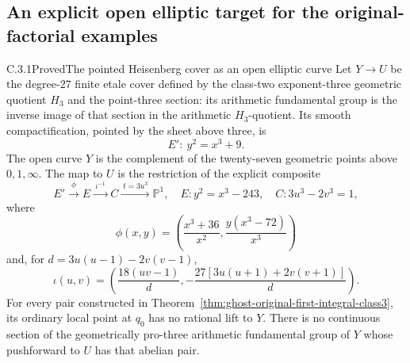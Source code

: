 \subsection{An explicit open elliptic target for the original-factorial examples}
\label{sec:ghost-elliptic-target}

\begin{result}{C.3.1}{Proved}{The pointed Heisenberg cover as an open elliptic curve}
\label{prop:ghost-elliptic-target}
Let \(Y\to U\) be the degree-\(27\) finite etale
cover defined by the class-two exponent-three geometric
quotient \(H_3\) and the point-three section: its
arithmetic fundamental group is the inverse image
of that section in the arithmetic \(H_3\)-quotient.
Its smooth compactification, pointed by the sheet
above three, is
\[
                 E':\ y^2=x^3+9.
\]
The open curve \(Y\) is the complement of the
twenty-seven geometric points above \(0,1,\infty\).
The map to \(U\) is the restriction of the explicit
composite
\[
 E'\xrightarrow{\ \phi\ } E
   \xrightarrow{\ \iota^{-1}\ } C
   \xrightarrow{\ t=3u^3\ }\mathbb P^1,
 \quad
 E:y^2=x^3-243,\quad C:3u^3-2v^3=1,
                                                        \tag{8}
\]
where
\[
 \phi(x,y)=\left(\frac{x^3+36}{x^2},
                    \frac{y(x^3-72)}{x^3}\right)
\]
and, for \(d=3u(u-1)-2v(v-1)\),
\[
 \iota(u,v)=
 \left(\frac{18(uv-1)}d,
       -\frac{27[3u(u+1)+2v(v+1)]}d\right).
                                                        \tag{9}
\]
For every pair constructed in
Theorem~\ref{thm:ghost-original-first-integral-class3},
its ordinary local point at \(q_0\) has no rational
lift to \(Y\). There is no continuous section of the
geometrically pro-three arithmetic fundamental group
of \(Y\) whose pushforward to \(U\) has that
abelian pair.
\end{result}
